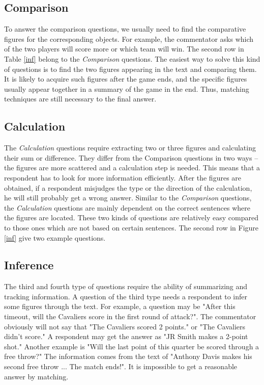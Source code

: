 \subsection{Comparison}
To answer the comparison questions, we usually need to find the comparative figures for the corresponding objects.
For example, the commentator asks which of the two players will score more or which team will win.
The second row in Table \ref{inf} belong to the \textit{Comparison} questions. The easiest way to solve this kind of questions is to find the two figures appearing in the text and comparing them. 
It is likely to acquire such figures after the game ends, and the specific figures usually appear together in a summary of the game in the end. Thus, matching techniques are still necessary to the final answer.

\subsection{Calculation}
The \textit{Calculation} questions require extracting two or three figures and calculating their sum or difference. They differ from the Comparison questions in two ways -- the figures are more scattered and a calculation step is needed. This means that a respondent has to look for more information efficiently. After the figures are obtained, if a respondent misjudges the type or the direction of the calculation, he will still probably get a wrong answer. 
Similar to the \textit{Comparison} questions, the \textit{Calculation} questions are mainly dependent on the correct sentences where the figures are located. These two kinds of questions are relatively easy compared to those ones which are not based on certain sentences. The second row in Figure \ref{inf} give two example questions.
\subsection{Inference}
The third and fourth type of questions require the ability of summarizing and tracking information. A question of the third type needs a respondent to infer some figures through the text. For example, a question may be "After this timeout, will the Cavaliers score in the first round of attack?". The commentator  obviously will not say that "The Cavaliers scored 2 points." or "The Cavaliers didn't score." A respondent may get the answer as "JR Smith makes a 2-point shot." Another example is "Will the last point of this quarter be scored through a free throw?" The information comes from the text of "Anthony Davis makes his second free throw ... The match ends!". It is impossible to get a reasonable answer by matching. 

